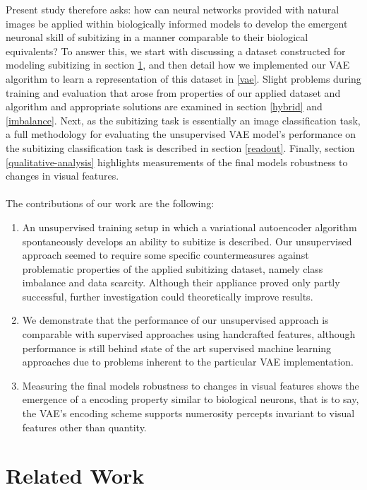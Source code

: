 \documentclass[twocolumn]{article}
\begin{document}
Present study therefore asks: how can neural networks provided with natural images be applied within biologically informed models to develop the emergent neuronal skill of subitizing in a manner comparable to their biological equivalents? To answer this, we start %
with discussing a dataset constructed for modeling subitizing in section \ref{related-work}, and then detail how we implemented our VAE algorithm to learn a representation of this dataset in \ref{vae}.  Slight problems during training and evaluation that arose from properties of our applied dataset and algorithm and appropriate solutions are examined in section \ref{hybrid}  and \ref{imbalance}.  Next, as the subitizing task is essentially an image classification task, a full
methodology for evaluating the unsupervised VAE model's performance on
the subitizing classification task is described in section \ref{readout}. Finally, section \ref{qualitative-analysis} highlights measurements of the final models robustness to changes in visual features.\\ \\
\noindent The contributions of our work are the following:
\begin{enumerate}[noitemsep,]
\item An unsupervised training setup in which a variational autoencoder algorithm spontaneously develops an ability to subitize is described. Our unsupervised approach seemed to require some specific countermeasures against problematic properties of the applied subitizing dataset, namely class imbalance and data scarcity. Although their appliance proved only partly successful, further investigation could theoretically improve results. 
\item We demonstrate that the
performance of our unsupervised approach is comparable with supervised
approaches using handcrafted features, although performance is still
behind state of the art supervised machine learning approaches due to
problems inherent to the particular VAE implementation. 
\item Measuring the final models robustness to changes in visual features
shows the emergence of a encoding property similar to biological neurons, that is
to say, the VAE's encoding scheme supports numerosity
percepts invariant to visual features other than quantity.
\end{enumerate}

\hypertarget{related-work}{%
\section{Related Work}\label{related-work}}
\end{document}
